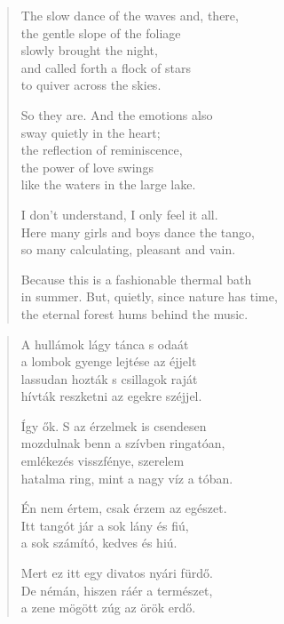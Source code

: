 \documentclass[11pt]{extbook}
\newcommand*{\centeredornament}{\centerline{\pgfornament[width=6cm]{88}}}
\begin{document}
\begin{verse}
  The slow dance of the waves and, there, \\
  the gentle slope of the foliage \\
  slowly brought the night, \\
  and called forth a flock of stars  \\
  to quiver across the skies.

  So they are. And the emotions also \\
  sway quietly in the heart; \\
  the reflection of reminiscence, \\
  the power of love swings \\
  like the waters in the large lake.

  I don't understand, I only feel it all. \\
  Here many girls and boys dance the tango, \\
  so many calculating, pleasant and vain.

  Because this is a fashionable thermal bath \\
  in summer. But, quietly, since nature has time,\hspace*{-1mm} \\
  the eternal forest hums behind the music.
\end{verse}

\newpage

\vspace*{-15mm}
\centeredornament



\begin{verse}
  A hullámok lágy tánca s odaát \\
  a lombok gyenge lejtése az éjjelt \\
  lassudan hozták s csillagok raját \\
  hívták reszketni az egekre széjjel.

  Így ők. S az érzelmek is csendesen \\
  mozdulnak benn a szívben ringatóan, \\
  emlékezés visszfénye, szerelem \\
  hatalma ring, mint a nagy víz a tóban.

  Én nem értem, csak érzem az egészet. \\
  Itt tangót jár a sok lány és fiú, \\
  a sok számító, kedves és hiú.

  Mert ez itt egy divatos nyári fürdő. \\
  De némán, hiszen ráér a természet, \\
  a zene mögött zúg az örök erdő.
\end{verse}
\end{document}
